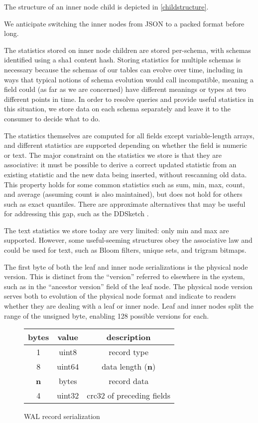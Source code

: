 \documentclass[9pt,twocolumn]{article}
\newcommand{\q}[1]{``#1''}
\begin{document}
    The structure of an inner node child is depicted in \autoref{childstructure}.

    We anticipate switching the inner nodes from JSON to a packed format before
    long.

    The statistics stored on inner node children are stored per-schema, with
    schemas identified using a sha1 content hash. Storing statistics for multiple
    schemas is necessary because the schemas of our tables can evolve over time,
    including in ways that typical notions of schema evolution would call
    incompatible, meaning a field could (as far as we are concerned) have
    different meanings or types at two different points in time. In order to
    resolve queries and provide useful statistics in this situation, we store
    data on each schema separately and leave it to the consumer to decide what to
    do.

    The statistics themselves are computed for all fields except variable-length
    arrays, and different statistics are supported depending on whether the field
    is numeric or text. The major constraint on the statistics we store is that
    they are associative: it must be possible to derive a correct updated
    statistic from an existing statistic and the new data being inserted, without
    rescanning old data. This property holds for some common statistics such as
    sum, min, max, count, and average (assuming count is also maintained), but
    does not hold for others such as exact quantiles. There are approximate
    alternatives that may be useful for addressing this gap, such as the
    DDSketch \cite{ddsketch}.

    The text statistics we store today are very limited: only min and max are
    supported. However, some useful-seeming structures obey the associative law
    and could be used for text, such as Bloom filters, unique sets, and trigram
    bitmaps.

    The first byte of both the leaf and inner node serializations is the physical
    node version. This is distinct from the \q{version} referred to elsewhere in
    the system, such as in the \q{ancestor version} field of the leaf node. The
    physical node version serves both to evolution of the physical node format
    and indicate to readers whether they are dealing with a leaf or inner node.
    Leaf and inner nodes split the range of the unsigned byte, enabling 128
    possible versions for each.

    \begin{figure}
      \begin{tabular}{ |c|c|c| }
        \hline
        bytes & value & description \\
        \hline
        1 & uint8 & record type \\
        8 & uint64 & data length (\textbf{n}) \\
        \textbf{n} & bytes & record data \\
        4 & uint32 & crc32 of preceding fields \\
        \hline
      \end{tabular}
      \caption{WAL record serialization}
      \label{walstructure}
    \end{figure}
\end{document}
